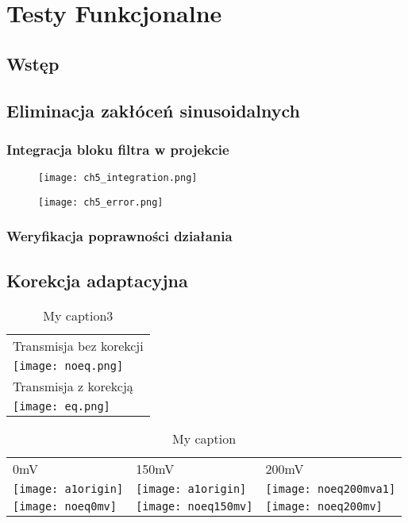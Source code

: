 \chapter{Testy Funkcjonalne}
\section{Wstęp}
\section{Eliminacja zakłóceń sinusoidalnych}
\subsection{Integracja bloku filtra w projekcie}
\begin{figure}[ht]
\centering
\texttt{[image: ch5\_integration.png]}
\end{figure}
\begin{figure}[ht]
\centering
\texttt{[image: ch5\_error.png]}
\end{figure}
\subsection{Weryfikacja poprawności działania}
\section{Korekcja adaptacyjna}

\begin{sidewaystable}[t]
\centering
\caption{My caption3}
\label{my-label3}
\begin{tabular}{l}
\hline
Transmisja bez korekcji \\
\texttt{[image: noeq.png]}\\ \hline
Transmisja z korekcją   \\
\texttt{[image: eq.png]}\\
\end{tabular}
\end{sidewaystable}

\begin{table}
\centering
\caption{My caption}
\label{my-label2}
\begin{tabular}{|l|l|l|}
\hline
0mV      & 150mV    & 200mV    \\
\texttt{[image: a1origin]} & \texttt{[image: a1origin]} & \texttt{[image: noeq200mva1]} \\
\texttt{[image: noeq0mv]}   & \texttt{[image: noeq150mv]}   & \texttt{[image: noeq200mv]}  \\ \hline
\end{tabular}
\end{table}


